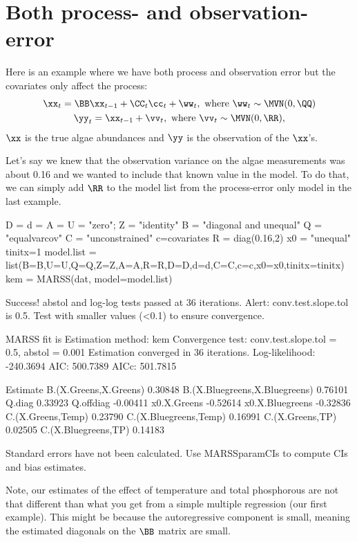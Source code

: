 \section{Both process- and observation-error}

Here is an example where we have both process and observation error but the covariates only affect the process:
\begin{equation}
\begin{gathered}
\xx_t = \BB\xx_{t-1} +  \CC_t\cc_t + \ww_t, \text{ where } \ww_t \sim \MVN(0,\QQ)\\ 
\yy_t = \xx_{t-1} +   \vv_t, \text{ where } \vv_t \sim \MVN(0,\RR), 
\end{gathered}
\end{equation}
$\xx$ is the true algae abundances and $\yy$ is the observation of the $\xx$'s.

Let's say we knew that the observation variance on the algae measurements was about 0.16 and we wanted to include that known value in the model.  To do that, we can simply add $\RR$ to the model list from the process-error only model in the last example.
\begin{Schunk}
\begin{Sinput}
 D = d = A = U = "zero"; Z = "identity"
 B = "diagonal and unequal"
 Q = "equalvarcov"
 C = "unconstrained"
 c=covariates
 R = diag(0.16,2)
 x0 = "unequal"
 tinitx=1
 model.list = list(B=B,U=U,Q=Q,Z=Z,A=A,R=R,D=D,d=d,C=C,c=c,x0=x0,tinitx=tinitx)
 kem = MARSS(dat, model=model.list)
\end{Sinput}
\begin{Soutput}
Success! abstol and log-log tests passed at 36 iterations.
Alert: conv.test.slope.tol is 0.5.
Test with smaller values (<0.1) to ensure convergence.

MARSS fit is
Estimation method: kem 
Convergence test: conv.test.slope.tol = 0.5, abstol = 0.001
Estimation converged in 36 iterations. 
Log-likelihood: -240.3694 
AIC: 500.7389   AICc: 501.7815   
 
                              Estimate
B.(X.Greens,X.Greens)          0.30848
B.(X.Bluegreens,X.Bluegreens)  0.76101
Q.diag                         0.33923
Q.offdiag                     -0.00411
x0.X.Greens                   -0.52614
x0.X.Bluegreens               -0.32836
C.(X.Greens,Temp)              0.23790
C.(X.Bluegreens,Temp)          0.16991
C.(X.Greens,TP)                0.02505
C.(X.Bluegreens,TP)            0.14183

Standard errors have not been calculated. 
Use MARSSparamCIs to compute CIs and bias estimates.
\end{Soutput}
\end{Schunk}
Note, our estimates of the effect of temperature and total phosphorous are not that different than what you get from a simple multiple regression (our first example).  This might be because the autoregressive component is small, meaning the estimated diagonals on the $\BB$ matrix are small.

